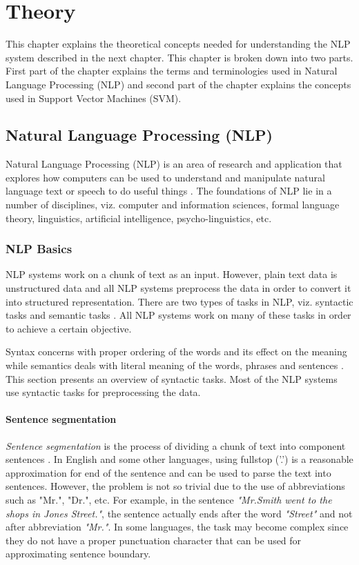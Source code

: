 \chapter{Theory}\label{chapter:theory}

This chapter explains the theoretical concepts needed for understanding the NLP system described in the next chapter. This chapter is broken down into two parts. First part of the chapter explains the terms and terminologies used in Natural Language Processing (NLP) and second part of the chapter explains the concepts  used in Support Vector Machines (SVM).

\section{Natural Language Processing (NLP)}

Natural Language Processing (NLP) is an area of research and application that explores how computers can be used to understand and manipulate natural language text or speech to do useful things \cite{chowdhury2003natural}. The foundations of NLP lie in a number of disciplines, viz. computer and information sciences, formal language theory, linguistics, artificial intelligence, psycho-linguistics,  etc.

\subsection{NLP Basics}\label{sec:NLPPipeline}

NLP systems work on a chunk of text as an input. However, plain text data is unstructured data and all NLP systems preprocess the data in order to convert it into structured representation. There are two types of tasks in NLP, viz. syntactic tasks and semantic tasks \cite{nlpcourse}. All NLP systems work on many of these tasks in order to achieve a certain objective.  

Syntax concerns with proper ordering of the words and its effect on the meaning while semantics deals with literal meaning of the words, phrases and sentences \cite{wiki:sentSeg}. This section presents an overview of syntactic tasks. Most of the NLP systems use syntactic tasks for preprocessing the data.

\subsubsection{Sentence segmentation}

\textit{Sentence segmentation} is the process of dividing a chunk of text into component sentences \cite{wiki:sentSeg}. In English and some other languages, using fullstop ('.') is a reasonable approximation for end of the sentence and can be used to parse the text into sentences. However, the problem is not so trivial due to the use of abbreviations such as "Mr.", "Dr.", etc. For example, in the sentence \textit{"Mr.Smith went to the shops in Jones Street."}, the sentence actually ends after the word \textit{"Street"} and not after abbreviation \textit{"Mr."}. In some languages, the task may become complex since they do not have a proper punctuation character that can be used for approximating sentence boundary.

